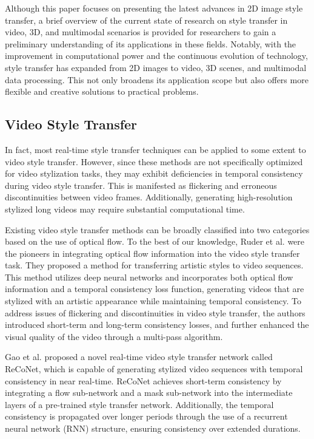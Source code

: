 \documentclass[preprint,12pt]{elsarticle}
\begin{document}
Although this paper focuses on presenting the latest advances in 2D image style transfer, a brief overview of the current state of research on style transfer in video, 3D, and multimodal scenarios is provided for researchers to gain a preliminary understanding of its applications in these fields. Notably, with the improvement in computational power and the continuous evolution of technology, style transfer has expanded from 2D images to video, 3D scenes, and multimodal data processing. This not only broadens its application scope but also offers more flexible and creative solutions to practical problems.

\subsection{Video Style Transfer}
In fact, most real-time style transfer techniques can be applied to some extent to video style transfer. However, since these methods are not specifically optimized for video stylization tasks, they may exhibit deficiencies in temporal consistency during video style transfer. This is manifested as flickering and erroneous discontinuities between video frames. Additionally, generating high-resolution stylized long videos may require substantial computational time.

Existing video style transfer methods can be broadly classified into two categories based on the use of optical flow. To the best of our knowledge, Ruder et al.\citep{98ruder2016artistic} were the pioneers in integrating optical flow information into the video style transfer task. They proposed a method for transferring artistic styles to video sequences. This method utilizes deep neural networks and incorporates both optical flow information and a temporal consistency loss function, generating videos that are stylized with an artistic appearance while maintaining temporal consistency. To address issues of flickering and discontinuities in video style transfer, the authors introduced short-term and long-term consistency losses, and further enhanced the visual quality of the video through a multi-pass algorithm.

Gao et al.\citep{99gao2019reconet} proposed a novel real-time video style transfer network called ReCoNet, which is capable of generating stylized video sequences with temporal consistency in near real-time. ReCoNet achieves short-term consistency by integrating a flow sub-network and a mask sub-network into the intermediate layers of a pre-trained style transfer network. Additionally, the temporal consistency is propagated over longer periods through the use of a recurrent neural network (RNN) structure, ensuring consistency over extended durations.
\end{document}
